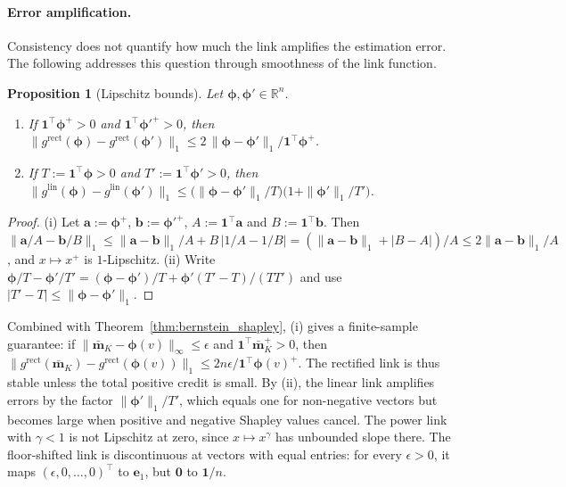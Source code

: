 \documentclass{article}
\newtheorem{proposition}{Proposition}
\begin{document}
\paragraph{Error amplification.}
Consistency does not quantify how much the link amplifies the estimation error. The following addresses this question through smoothness of the link function.

\begin{proposition}[Lipschitz bounds]\label{prop:link_lipschitz}
Let $\boldsymbol{\phi}, \boldsymbol{\phi}' \in \mathbb{R}^n$.
\begin{enumerate}
    \item[(i)] If $\mathbf{1}^\top \boldsymbol{\phi}^+ > 0$ and $\mathbf{1}^\top \boldsymbol{\phi}'^+ > 0$, then $\big\| g^{\text{rect}}(\boldsymbol{\phi}) - g^{\text{rect}}(\boldsymbol{\phi}') \big\|_1 \le 2\, \|\boldsymbol{\phi} - \boldsymbol{\phi}'\|_1 / \mathbf{1}^\top \boldsymbol{\phi}^+$.
    \item[(ii)] If $T := \mathbf{1}^\top \boldsymbol{\phi} > 0$ and $T' := \mathbf{1}^\top \boldsymbol{\phi}' > 0$, then $\big\| g^{\text{lin}}(\boldsymbol{\phi}) - g^{\text{lin}}(\boldsymbol{\phi}') \big\|_1 \le \big( \|\boldsymbol{\phi} - \boldsymbol{\phi}'\|_1 / T \big) \big( 1 + \|\boldsymbol{\phi}'\|_1 / T' \big)$.
\end{enumerate}
\end{proposition}

\begin{proof}
(i) Let $\mathbf{a} := \boldsymbol{\phi}^+$, $\mathbf{b} := \boldsymbol{\phi}'^+$, $A := \mathbf{1}^\top \mathbf{a}$ and $B := \mathbf{1}^\top \mathbf{b}$. Then $\|\mathbf{a}/A - \mathbf{b}/B\|_1 \le \|\mathbf{a} - \mathbf{b}\|_1 / A + B\, |1/A - 1/B| = (\|\mathbf{a} - \mathbf{b}\|_1 + |B - A|)/A \le 2\|\mathbf{a} - \mathbf{b}\|_1 / A$, and $x \mapsto x^+$ is $1$-Lipschitz. (ii) Write $\boldsymbol{\phi}/T - \boldsymbol{\phi}'/T' = (\boldsymbol{\phi} - \boldsymbol{\phi}')/T + \boldsymbol{\phi}'(T' - T)/(T T')$ and use $|T' - T| \le \|\boldsymbol{\phi} - \boldsymbol{\phi}'\|_1$.
\end{proof}

Combined with Theorem~\ref{thm:bernstein_shapley}, (i) gives a finite-sample guarantee: if $\|\bar{\mathbf{m}}_K - \boldsymbol{\phi}(v)\|_\infty \le \epsilon$ and $\mathbf{1}^\top \bar{\mathbf{m}}_K^+ > 0$, then $\|g^{\text{rect}}(\bar{\mathbf{m}}_K) - g^{\text{rect}}(\boldsymbol{\phi}(v))\|_1 \le 2n\epsilon / \mathbf{1}^\top \boldsymbol{\phi}(v)^+$. The rectified link is thus stable unless the total positive credit is small. By (ii), the linear link amplifies errors by the factor $\|\boldsymbol{\phi}'\|_1 / T'$, which equals one for non-negative vectors but becomes large when positive and negative Shapley values cancel. The power link with $\gamma < 1$ is not Lipschitz at zero, since $x \mapsto x^\gamma$ has unbounded slope there. The floor-shifted link is discontinuous at vectors with equal entries: for every $\epsilon > 0$, it maps $(\epsilon, 0, \dots, 0)^\top$ to $\mathbf{e}_1$, but $\mathbf{0}$ to $\mathbf{1}/n$.
\end{document}
